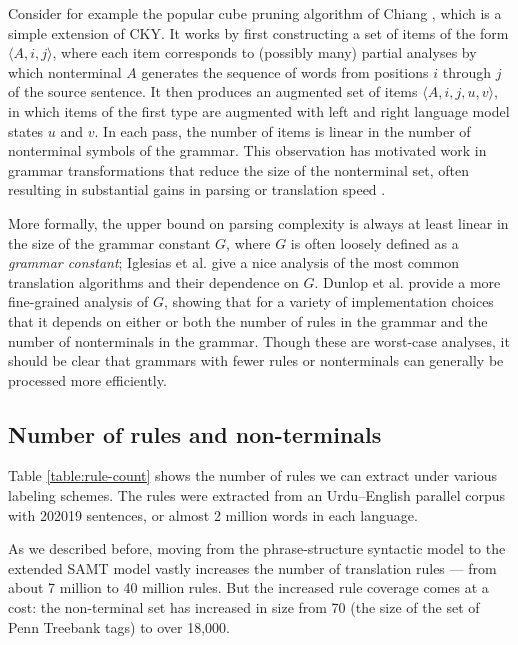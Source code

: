 \documentclass[a4paper]{article}
\begin{document}
Consider for example the popular cube pruning algorithm of Chiang
, which is a simple extension of CKY. It works by first
constructing a set of items of the form $\langle A, i, j \rangle$,
where each item corresponds to (possibly many) partial analyses by
which nonterminal $A$ generates the sequence of words from positions
$i$ through $j$ of the source sentence. It then produces an augmented
set of items $\langle A, i, j, u, v \rangle$, in which items of the
first type are augmented with left and right language model states $u$
and $v$. In each pass, the number of items is linear in the number of
nonterminal symbols of the grammar. This observation has motivated
work in grammar transformations that reduce the size of the
nonterminal set, often resulting in substantial gains in parsing or
translation speed \cite{song2008,denero-efficient-parsing,xiao2009}.

More formally, the upper bound on parsing complexity is always at
least linear in the size of the grammar constant $G$, where $G$ is
often loosely defined as a {\it grammar constant}; Iglesias et al.
 give a nice analysis of the most common translation algorithms
and their dependence on $G$. Dunlop et al.  provide a more
fine-grained analysis of $G$, showing that for a variety of
implementation choices that it depends on either or both the number of
rules in the grammar and the number of nonterminals in the grammar.
Though these are worst-case analyses, it should be clear that grammars
with fewer rules or nonterminals can generally be processed more
efficiently.

\subsection{Number of rules and non-terminals}

Table \ref{table:rule-count} shows the number of rules we can extract under various labeling schemes. The rules were extracted from an Urdu--English parallel corpus with 202019 sentences, or almost 2 million words in each language.

As we described before, moving from the phrase-structure syntactic model to the extended SAMT model vastly increases the number of translation rules --- from about 7 million to 40 million rules. But the increased rule coverage comes at a cost: the non-terminal set has increased in size from 70 (the size of the set of Penn Treebank tags) to over 18,000.
\end{document}

